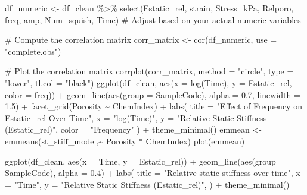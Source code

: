 \documentclass[
  letterpaper,
  DIV=11,
  numbers=noendperiod]{scrartcl}
\newenvironment{Shaded}{\begin{snugshade}}{\end{snugshade}}
\newcommand{\AttributeTok}[1]{\textcolor[rgb]{0.40,0.45,0.13}{#1}}
\newcommand{\CommentTok}[1]{\textcolor[rgb]{0.37,0.37,0.37}{#1}}
\newcommand{\FloatTok}[1]{\textcolor[rgb]{0.68,0.00,0.00}{#1}}
\newcommand{\FunctionTok}[1]{\textcolor[rgb]{0.28,0.35,0.67}{#1}}
\newcommand{\NormalTok}[1]{\textcolor[rgb]{0.00,0.23,0.31}{#1}}
\newcommand{\OtherTok}[1]{\textcolor[rgb]{0.00,0.23,0.31}{#1}}
\newcommand{\SpecialCharTok}[1]{\textcolor[rgb]{0.37,0.37,0.37}{#1}}
\newcommand{\StringTok}[1]{\textcolor[rgb]{0.13,0.47,0.30}{#1}}
\begin{document}
\begin{Shaded}
\begin{Highlighting}[]
\NormalTok{df\_numeric }\OtherTok{\textless{}{-}}\NormalTok{ df\_clean }\SpecialCharTok{\%\textgreater{}\%}
  \FunctionTok{select}\NormalTok{(Estatic\_rel, strain, Stress\_kPa, Relporo, freq, amp, Num\_squish, Time)  }\CommentTok{\# Adjust based on your actual numeric variables}

\CommentTok{\# Compute the correlation matrix}
\NormalTok{corr\_matrix }\OtherTok{\textless{}{-}} \FunctionTok{cor}\NormalTok{(df\_numeric, }\AttributeTok{use =} \StringTok{"complete.obs"}\NormalTok{)}

\CommentTok{\# Plot the correlation matrix}
\FunctionTok{corrplot}\NormalTok{(corr\_matrix, }\AttributeTok{method =} \StringTok{"circle"}\NormalTok{, }\AttributeTok{type =} \StringTok{"lower"}\NormalTok{, }\AttributeTok{tl.col =} \StringTok{"black"}\NormalTok{)}
\FunctionTok{ggplot}\NormalTok{(df\_clean, }\FunctionTok{aes}\NormalTok{(}\AttributeTok{x =} \FunctionTok{log}\NormalTok{(Time), }\AttributeTok{y =}\NormalTok{ Estatic\_rel, }\AttributeTok{color =}\NormalTok{ freq)) }\SpecialCharTok{+}
  \FunctionTok{geom\_line}\NormalTok{(}\FunctionTok{aes}\NormalTok{(}\AttributeTok{group =}\NormalTok{ SampleCode), }\AttributeTok{alpha =} \FloatTok{0.7}\NormalTok{, }\AttributeTok{linewidth =} \FloatTok{1.5}\NormalTok{) }\SpecialCharTok{+}
  \FunctionTok{facet\_grid}\NormalTok{(Porosity }\SpecialCharTok{\textasciitilde{}}\NormalTok{ ChemIndex) }\SpecialCharTok{+}
  \FunctionTok{labs}\NormalTok{(}
    \AttributeTok{title =} \StringTok{"Effect of Frequency on Estatic\_rel Over Time"}\NormalTok{,}
    \AttributeTok{x =} \StringTok{"log(Time)"}\NormalTok{,}
    \AttributeTok{y =} \StringTok{"Relative Static Stiffness (Estatic\_rel)"}\NormalTok{,}
    \AttributeTok{color =} \StringTok{"Frequency"}
\NormalTok{  ) }\SpecialCharTok{+}
  \FunctionTok{theme\_minimal}\NormalTok{()}
\NormalTok{emmean }\OtherTok{\textless{}{-}} \FunctionTok{emmeans}\NormalTok{(st\_stiff\_model,}\SpecialCharTok{\textasciitilde{}}\NormalTok{ Porosity }\SpecialCharTok{*}\NormalTok{  ChemIndex)}
\FunctionTok{plot}\NormalTok{(emmean)}

\FunctionTok{ggplot}\NormalTok{(df\_clean, }\FunctionTok{aes}\NormalTok{(}\AttributeTok{x =}\NormalTok{ Time, }\AttributeTok{y =}\NormalTok{ Estatic\_rel)) }\SpecialCharTok{+}
  \FunctionTok{geom\_line}\NormalTok{(}\FunctionTok{aes}\NormalTok{(}\AttributeTok{group =}\NormalTok{ SampleCode), }\AttributeTok{alpha =} \FloatTok{0.4}\NormalTok{) }\SpecialCharTok{+}
  \FunctionTok{labs}\NormalTok{(}
    \AttributeTok{title =} \StringTok{"Relative static stiffness over time"}\NormalTok{,}
    \AttributeTok{x =} \StringTok{"Time"}\NormalTok{,}
    \AttributeTok{y =} \StringTok{"Relative Static Stiffness (Estatic\_rel)"}\NormalTok{,}
\NormalTok{  ) }\SpecialCharTok{+}
  \FunctionTok{theme\_minimal}\NormalTok{()}


\end{Highlighting}
\end{Shaded}
\end{document}
